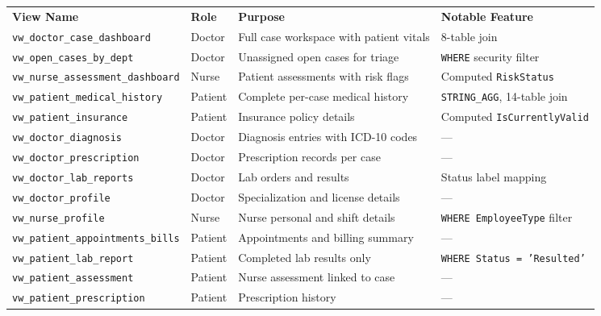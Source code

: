 \documentclass{article}
\newcommand{\theadcell}{\color{white}\bfseries}
\begin{document}
\begin{center}
\renewcommand{\arraystretch}{1.5}
\begin{tabular}{L{3.5cm} C{1.4cm} L{3.2cm} L{4.5cm}}
   \theadcell View Name & \theadcell Role & \theadcell Purpose & \theadcell Notable Feature \\
   \texttt{vw\_doctor\_case\_dashboard}      & Doctor  & Full case workspace with patient vitals & 8-table join \\
   \texttt{vw\_open\_cases\_by\_dept}        & Doctor  & Unassigned open cases for triage & \texttt{WHERE} security filter \\
   \texttt{vw\_nurse\_assessment\_dashboard} & Nurse   & Patient assessments with risk flags & Computed \texttt{RiskStatus} \\
   \texttt{vw\_patient\_medical\_history}    & Patient & Complete per-case medical history & \texttt{STRING\_AGG}, 14-table join \\
   \texttt{vw\_patient\_insurance}           & Patient & Insurance policy details & Computed \texttt{IsCurrentlyValid} \\
   \texttt{vw\_doctor\_diagnosis}            & Doctor  & Diagnosis entries with ICD-10 codes & --- \\
   \texttt{vw\_doctor\_prescription}         & Doctor  & Prescription records per case & --- \\
   \texttt{vw\_doctor\_lab\_reports}         & Doctor  & Lab orders and results & Status label mapping \\
   \texttt{vw\_doctor\_profile}              & Doctor  & Specialization and license details & --- \\
   \texttt{vw\_nurse\_profile}               & Nurse   & Nurse personal and shift details & \texttt{WHERE EmployeeType} filter \\
   \texttt{vw\_patient\_appointments\_bills} & Patient & Appointments and billing summary & --- \\
   \texttt{vw\_patient\_lab\_report}         & Patient & Completed lab results only & \texttt{WHERE Status = 'Resulted'} \\
   \texttt{vw\_patient\_assessment}          & Patient & Nurse assessment linked to case & --- \\
   \texttt{vw\_patient\_prescription}        & Patient & Prescription history & --- \\
\end{tabular}
\end{center}
\end{document}
